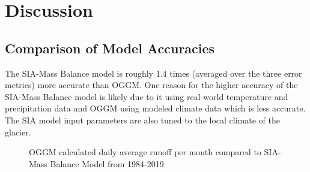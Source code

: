 \documentclass{article}
\begin{document}
\section{Discussion}
\subsection{Comparison of Model Accuracies}
The SIA-Mass Balance model is roughly 1.4 times (averaged over the three error metrics) more accurate than OGGM. One reason for the 
higher accuracy of the SIA-Mass Balance model is likely due to it 
using real-world temperature and precipitation data and OGGM using modeled climate data which is less accurate. The SIA model input 
parameters are also tuned to the local climate of the glacier.

\begin{figure}[h!]
    \centering
    \caption{OGGM calculated daily average runoff per month compared to SIA-Mass Balance Model from 1984-2019}
    \label{fig:oggm_model_run_1984_2019}
\end{figure}
\FloatBarrier
\end{document}
